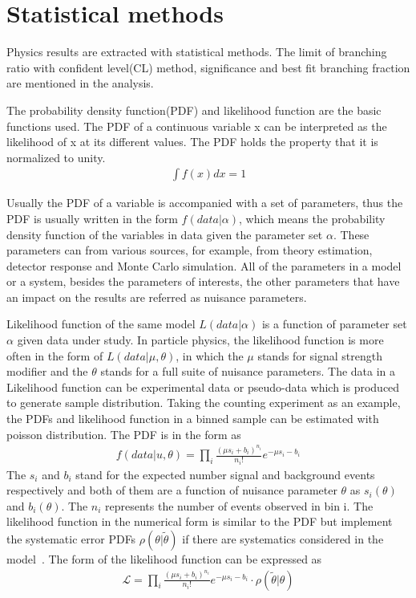 \section{Statistical methods}

Physics results are extracted with statistical methods. The limit of branching ratio with confident level(CL) method, significance and best fit branching fraction are mentioned in the analysis.  

The probability density function(PDF) and likelihood function are the basic functions used. The PDF of a continuous variable x can be interpreted as the likelihood of x at its different values. The PDF holds the property that it is normalized to unity. 
\begin{align*}
\int f(x) dx =1
\end{align*}

Usually the PDF of a variable is accompanied with a set of parameters, thus the PDF is usually written in the form $f(data|\alpha)$, which means the probability density function of the variables in data  given the parameter set $\alpha$. These parameters can from various sources, for example, from theory estimation, detector response and Monte Carlo simulation. All of the parameters in a model or a system, besides the parameters of interests, the other parameters that have an impact on the results are referred as nuisance parameters.       


Likelihood function of the same model $L(data|\alpha)$ is a function of parameter set $\alpha$ given data under study. In particle physics, the likelihood function is more often in the form of $L(data|\mu,\theta)$, in which the $\mu$ stands for signal strength modifier and the $\theta$ stands for a full suite of nuisance parameters. The data in a Likelihood function can be experimental data or pseudo-data which is produced to generate sample distribution. 
Taking the counting experiment as an example, the PDFs and likelihood function in a binned sample can be estimated with poisson distribution. The  PDF is in the form as
\begin{align*}
f(data|u,\theta)=\prod_{i}\frac{(\mu s_{i}+b_{i})^{n_{i}}}{n_{i}!}e^{-\mu s_{i}-b_{i}}
\end{align*}
The $s_{i}$ and $b_{i}$ stand for the expected number signal and background events respectively and both of them are a function of nuisance parameter $\theta$ as $s_{i}(\theta)$ and $b_{i}(\theta)$. The $n_{i}$ represents the number of events observed in bin i. The likelihood function in the numerical form is similar to the PDF but implement the systematic error PDFs $\rho(\theta|\tilde{\theta})$ if there are systematics considered in the model~\cite{CMS-NOTE-2011-005}. The form of the likelihood function can be expressed as 
\begin{align*}
\mathcal{L}=\prod_{i}\frac{(\mu s_{i}+b_{i})^{n_{i}}}{n_{i}!}e^{-\mu s_{i}-b_{i}}\cdot \rho(\tilde{\theta}|\theta)
\end{align*}

